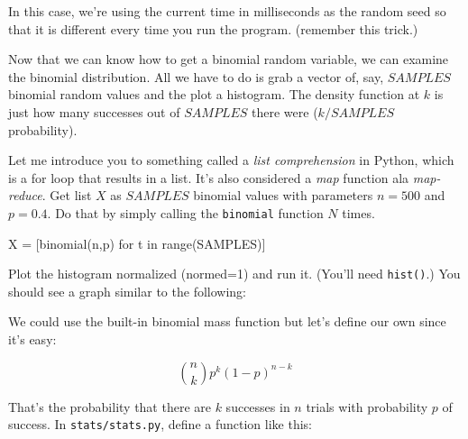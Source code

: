 \begin{fullwidth}
In this case, we're using the current time in milliseconds as the random seed so that it is different every time you run the program. (remember this trick.)

\step Now that we can know how to get a binomial random variable, we can examine the binomial distribution.  All we have to do is grab a vector of, say, $SAMPLES$ binomial random values and the plot a histogram.  The density function at $k$ is just how many successes out of $SAMPLES$ there were ($k/SAMPLES$ probability).

Let me introduce you to something called a {\em list comprehension} in Python, which is a for loop that results in a list. It's also considered a {\em map} function ala {\em map-reduce}.  Get list $X$ as $SAMPLES$ binomial values with parameters $n=500$ and $p=0.4$. Do that by simply calling the {\tt binomial} function $N$ times.

\begin{pyverbatim}
X = [binomial(n,p) for t in range(SAMPLES)]
\end{pyverbatim}

\step Plot the histogram normalized (normed=1) and run it. (You'll need {\tt hist()}.) You should see a graph similar to the following:


\step We could use the built-in binomial mass function but let's define our own since it's easy:

\[\tag{Binomial mass function}
\binom{n}{k} p^k (1-p)^{n-k}
\]

\noindent That's the probability that there are $k$ successes in $n$ trials with probability $p$ of success. In {\tt stats/stats.py}, define a function like this:


\end{fullwidth}
